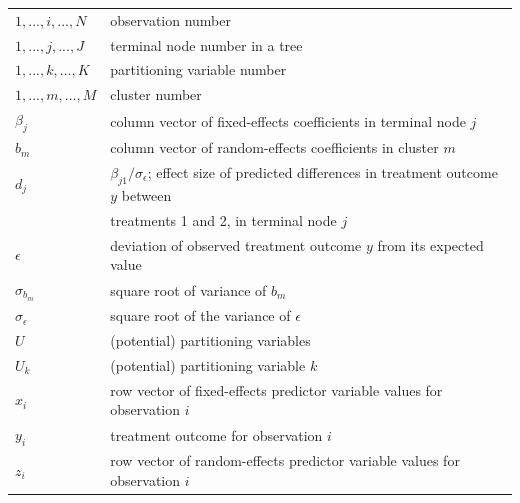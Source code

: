 \documentclass[nobf,doc]{apa}
\begin{document}
\begin{table}[!h]
\begin{tabular}{ll}
$1,...,i,...,N$ &   observation number \\
$1,...,j,...,J$ &	terminal node number in a tree \\
$1,...,k,...,K$ &   partitioning variable number \\
$1,...,m,...,M$	&	cluster number \\
$\beta_{j}$		& 	column vector of fixed-effects coefficients in terminal node $j$ \\
$b_{m}$ 		&	column vector of random-effects coefficients in cluster $m$\\
$d_j$			&	$\beta_{j1} / \sigma_{\epsilon}$; effect size of predicted differences in treatment outcome $y$ between \\
				&	treatments 1 and 2, in terminal node $j$\\
$\epsilon$		& 	deviation of observed treatment outcome $y$ from its expected value\\
$\sigma_{b_m}$	&	square root of variance of $b_m$\\
$\sigma_{\epsilon}$&square root of the variance of $\epsilon$\\
$U$ 			&	(potential) partitioning variables \\
$U_k$			&	(potential) partitioning variable $k$ \\
$x_i$ 			&	row vector of fixed-effects predictor variable values for observation $i$\\
$y_i$ 			&	treatment outcome for observation $i$ \\
$z_i$ 			&	row vector of random-effects predictor variable values for observation $i$\\
\end{tabular}
\end{table} 
\end{document}
